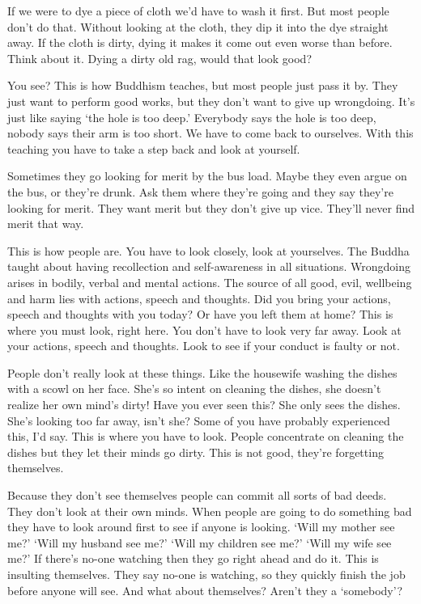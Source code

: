 If we were to dye a piece of cloth we'd have to wash it first. But most people don't do that. Without looking at the cloth, they dip it into the dye straight away. If the cloth is dirty, dying it makes it come out even worse than before. Think about it. Dying a dirty old rag, would that look good? 

You see? This is how Buddhism teaches, but most people just pass it by. They just want to perform good works, but they don't want to give up wrongdoing. It's just like saying `the hole is too deep.' Everybody says the hole is too deep, nobody says their arm is too short. We have to come back to ourselves. With this teaching you have to take a step back and look at yourself. 

Sometimes they go looking for merit by the bus load. Maybe they even argue on the bus, or they're drunk. Ask them where they're going and they say they're looking for merit. They want merit but they don't give up vice. They'll never find merit that way. 

This is how people are. You have to look closely, look at yourselves. The Buddha taught about having recollection and self-awareness in all situations. Wrongdoing arises in bodily, verbal and mental actions. The source of all good, evil, wellbeing and harm lies with actions, speech and thoughts. Did you bring your actions, speech and thoughts with you today? Or have you left them at home? This is where you must look, right here. You don't have to look very far away. Look at your actions, speech and thoughts. Look to see if your conduct is faulty or not. 

People don't really look at these things. Like the housewife washing the dishes with a scowl on her face. She's so intent on cleaning the dishes, she doesn't realize her own mind's dirty! Have you ever seen this? She only sees the dishes. She's looking too far away, isn't she? Some of you have probably experienced this, I'd say. This is where you have to look. People concentrate on cleaning the dishes but they let their minds go dirty. This is not good, they're forgetting themselves. 

Because they don't see themselves people can commit all sorts of bad deeds. They don't look at their own minds. When people are going to do something bad they have to look around first to see if anyone is looking. `Will my mother see me?' `Will my husband see me?' `Will my children see me?' `Will my wife see me?' If there's no-one watching then they go right ahead and do it. This is insulting themselves. They say no-one is watching, so they quickly finish the job before anyone will see. And what about themselves? Aren't they a `somebody'?


